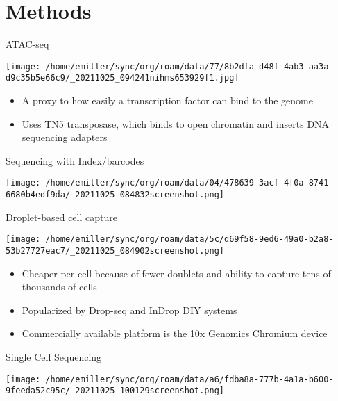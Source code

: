 \documentclass[bigger]{beamer}
\begin{document}
\section{Methods}
\label{sec:orgaf2f66d}

\begin{frame}[label={sec:orgdd8c5e7}]{ATAC-seq}
\begin{center}
\texttt{[image: /home/emiller/sync/org/roam/data/77/8b2dfa-d48f-4ab3-aa3a-d9c35b5e66c9/\_20211025\_094241nihms653929f1.jpg]}
\end{center}

\begin{itemize}
\item A proxy to how easily a transcription factor can bind to the genome
\item Uses TN5 transposase, which binds to open chromatin and inserts DNA sequencing
adapters
\end{itemize}
\end{frame}


\begin{frame}[label={sec:orgfeb20db}]{Sequencing with Index/barcodes}
\begin{center}
\texttt{[image: /home/emiller/sync/org/roam/data/04/478639-3acf-4f0a-8741-6680b4edf9da/\_20211025\_084832screenshot.png]}
\end{center}
\end{frame}


\begin{frame}[label={sec:org5ba670e}]{Droplet-based cell capture}
\begin{center}
\texttt{[image: /home/emiller/sync/org/roam/data/5c/d69f58-9ed6-49a0-b2a8-53b27727eac7/\_20211025\_084902screenshot.png]}
\end{center}

\begin{itemize}
\item Cheaper per cell because of fewer doublets and ability to capture tens of thousands of cells
\item Popularized by Drop-seq and InDrop DIY systems
\item Commercially available platform is the 10x Genomics Chromium device
\end{itemize}
\end{frame}


\begin{frame}[label={sec:orgbd5a49b}]{Single Cell Sequencing}
\begin{center}
\texttt{[image: /home/emiller/sync/org/roam/data/a6/fdba8a-777b-4a1a-b600-9feeda52c95c/\_20211025\_100129screenshot.png]}
\end{center}
\end{frame}
\end{document}
